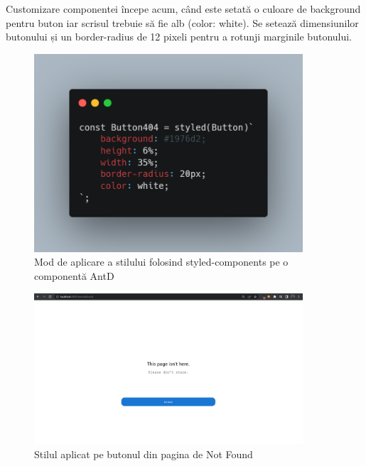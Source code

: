 \noindent Customizare componentei începe acum, când este setată o culoare de background pentru buton iar scrisul trebuie să fie alb (color: white). Se setează dimensiunilor butonului și un border-radius de 12 pixeli pentru a rotunji marginile butonului. 
\begin{figure}[h]
	\centering
	\includegraphics[width=100mm]{figs/cssStyle.png}
	\caption{Mod de aplicare a stilului folosind styled-components pe o componentă AntD}
	\label{fig:cssStyle}
\end{figure}

\newpage

\begin{figure}[h]
	\centering
	\includegraphics[width=100mm]{figs/notFoundPage.png}
	\caption{Stilul aplicat pe butonul din pagina de Not Found}
	\label{fig:notFoundPage}
\end{figure}

